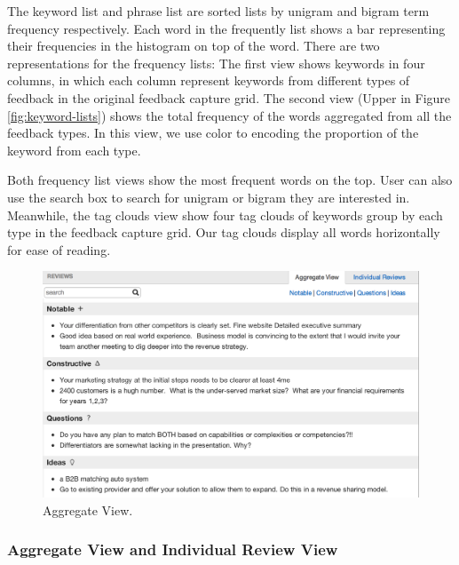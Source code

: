 \documentclass{sigchi}
\begin{document}
The keyword list and phrase list are sorted lists by unigram and
bigram term frequency respectively.  Each word in the frequently list shows a bar representing their
frequencies in the histogram on top of the word.  There are two representations for the frequency lists: The first view shows keywords in four columns, in which each column represent keywords from different types of feedback in the original feedback capture grid.
The second view (Upper in Figure \ref{fig:keyword-lists}) shows the total frequency of the words aggregated from all the feedback types.  In this view, we use color to encoding the proportion of the keyword from each type.

Both frequency list views show the most frequent words on the top.  User can
also use the search box to search for unigram or bigram they are interested in.
Meanwhile, the tag clouds view show four tag clouds of keywords group by each
type in the feedback capture grid.  Our tag clouds display all words
horizontally for ease of reading.


\begin{figure}[h]
\centering
\includegraphics[width=\columnwidth]{images/aggregate-view}
\caption{Aggregate View.}
\label{fig:aggregate-view}
\end{figure}

\subsubsection{Aggregate View and Individual Review View}
\end{document}
